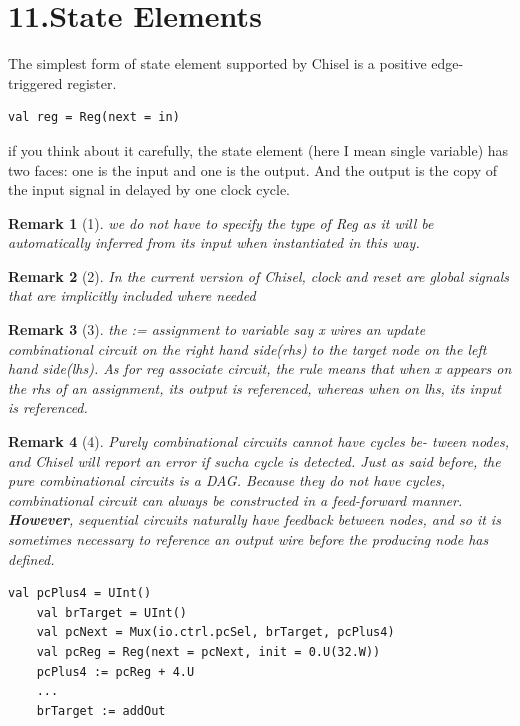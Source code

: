 \documentclass[11pt]{article}
\newtheorem*{remark}{Remark}
\begin{document}
\section*{11.State Elements}
The simplest form of state element supported by Chisel is a positive edge-triggered register.
\begin{lstlisting}[style = myScalastyle]
val reg = Reg(next = in)
\end{lstlisting}
if you think about it carefully, the state element (here I mean single variable) has two faces: one is the input and one is the output. And the output is the copy of the input signal in delayed by one clock cycle.
\begin{remark}[1]
	we do not have to specify the type of Reg as it will be automatically inferred from its input when instantiated in
	this way.
\end{remark}
\begin{remark}[2]
	In the current version of Chisel, clock and
	reset are global signals that are implicitly included
	where needed
\end{remark}
\begin{remark}[3]
	the := assignment to variable say x wires an update combinational circuit on the right hand side(rhs) to the target node on the left hand side(lhs). As for reg associate circuit, the rule means that when x appears on the rhs of an assignment, its output is referenced, whereas when on lhs, its input is referenced.
\end{remark}
\begin{remark}[4]
	Purely combinational circuits cannot have cycles be-
	tween nodes, and Chisel will report an error if sucha cycle is detected. Just as said before, the pure combinational circuits is a DAG. Because they do not have cycles, combinational circuit can always be constructed in a feed-forward manner. \textbf{However}, sequential circuits naturally have feedback between nodes, and so it is sometimes necessary to reference an output wire before the producing node has defined.
	\begin{lstlisting}[style = myScalastyle]
	val pcPlus4 = UInt()
	val brTarget = UInt()
	val pcNext = Mux(io.ctrl.pcSel, brTarget, pcPlus4)
	val pcReg = Reg(next = pcNext, init = 0.U(32.W))
	pcPlus4 := pcReg + 4.U
	...
	brTarget :=	addOut
	\end{lstlisting}
\end{remark}
\end{document}
